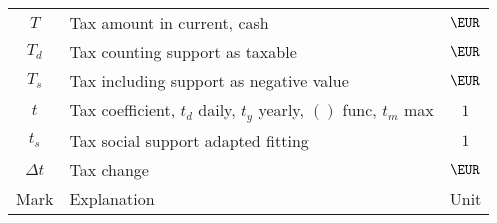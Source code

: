 \begin{center}
\begin{supertabular}{ c l c }
$ T	$& Tax amount in current, cash			&$ \EUR		$\\
$ T_d	$& Tax counting support as taxable		&$ \EUR		$\\
$ T_s	$& Tax including support as negative value	&$ \EUR		$\\
$t$&Tax coefficient, $t_d$ daily, $t_y$ yearly, $()$ func, $t_m$ max&$ 1$\\
$ t_s	$& Tax social support adapted fitting		&$ 1		$\\
$\Delta t$& Tax change					&$ \EUR		$\\
\hline
  Mark		 & Explanation				&  Unit		 \\
\end{supertabular}
\end{center}
